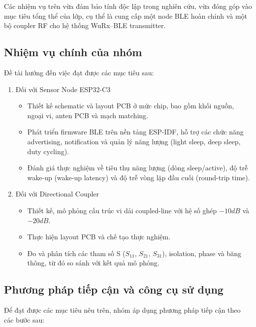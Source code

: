 Các nhiệm vụ trên vừa đảm bảo tính độc lập trong nghiên cứu, vừa đóng góp vào mục tiêu tổng thể của lớp, cụ thể là cung cấp một node BLE hoàn chỉnh và một bộ coupler RF cho hệ thống WuRx–BLE transmitter.

\subsection{Nhiệm vụ chính của nhóm}

\noindent Đề tài hướng đến việc đạt được các mục tiêu sau:

\begin{enumerate}[label=\arabic*)]
	\item Đối với Sensor Node ESP32-C3
		\begin{itemize}[label=-]
			\item Thiết kế schematic và layout PCB ở mức chip, bao gồm khối nguồn, ngoại vi, anten PCB và mạch matching.
			\item Phát triển firmware BLE trên nền tảng ESP-IDF, hỗ trợ các chức năng advertising, notification và quản lý năng lượng (light sleep, deep sleep, duty cycling).
			\item Đánh giá thực nghiệm về tiêu thụ năng lượng (dòng sleep/active), độ trễ wake-up (wake-up latency) và độ trễ vòng lặp đầu cuối (round-trip time).
		\end{itemize}
	\item Đối với Directional Coupler
		\begin{itemize}[label=-]
			\item Thiết kế, mô phỏng cấu trúc vi dải coupled-line với hệ số ghép $-10dB$ và $-20dB$.
			\item Thực hiện layout PCB và chế tạo thực nghiệm.
			\item Đo và phân tích các tham số S ($S_{11}$, $ S_{21} $, $ S_{31} $), isolation, phase và băng thông, từ đó so sánh với kết quả mô phỏng.
		\end{itemize}
\end{enumerate}

\subsection{Phương pháp tiếp cận và công cụ sử dụng}

\noindent Để đạt được các mục tiêu nêu trên, nhóm áp dụng phương pháp tiếp cận theo các bước sau:

